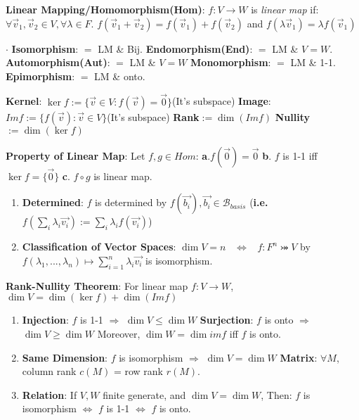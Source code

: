 \documentclass[9pt]{article}
\begin{document}
\textbf{Linear Mapping/Homomorphism(Hom)}: {\small $f:V\to W$ is \textit{linear map} if: $\forall \vec{v}_1,\vec{v}_2\in V,\forall \lambda\in F$. $f(\vec{v}_1+\vec{v}_2)=f(\vec{v}_1)+f(\vec{v}_2)$ and $f(\lambda\vec{v}_1)=\lambda f(\vec{v}_1)$}

$\cdot$ {\scriptsize \textbf{Isomorphism}: $=$ LM \& Bij. \quad \textbf{Endomorphism(End)}: $=$ LM \& $V=W$. \quad \textbf{Automorphism(Aut)}: $=$ LM \& $V=W$ \quad \textbf{Monomorphism}: $=$ LM \& 1-1. \quad \textbf{Epimorphism}: $=$ LM \& onto.}

\textbf{Kernel}: $\ker f:=\{\vec{v}\in V:f(\vec{v})=\vec{0}\}${\tiny (It's subspace)} \quad \textbf{Image}: $Im f:=\{f(\vec{v}):\vec{v}\in V\}${\tiny (It's subspace)} \quad \textbf{Rank}$:=\dim(Im f)$ \quad \textbf{Nullity}$:=\dim(\ker f)$

\textbf{Property of Linear Map}: Let $f,g\in Hom$: \quad \textbf{a}.$f(\vec{0})=\vec{0}$ \quad \textbf{b}. $f$ is 1-1 iff $\ker f=\{\vec{0}\}$ \quad \textbf{c}. $f\circ g$ is linear map. \ \

\begin{enumerate}[itemsep=-2pt, topsep=-2pt]
    \item \textbf{Determined}: $f$ is determined by $f(\vec{b_i}),\vec{b_i}\in \mathcal{B}_{basis}$ {\footnotesize (\star\textbf{i.e.} $f(\sum_{i}\lambda_i\vec{v_i}):=\sum_{i}\lambda_if(\vec{v_i})$)}
    \item \textbf{Classification of Vector Spaces}: $\dim V=n$ \ $\Leftrightarrow$ \ $f:F^n\bij V$ by $f(\lambda_1,...,\lambda_n)\mapsto\sum_{i=1}^{n}\lambda_i\vec{v_i}$ is isomorphism.
\end{enumerate}

\textbf{Rank-Nullity Theorem}: For linear map $f:V\to W$, $\dim V=\dim(\ker f)+\dim(Im f)$ \quad \quad {}

\begin{enumerate}[itemsep=-2pt, topsep=-2pt]
    \item \textbf{Injection}: $f$ is 1-1 $\Rightarrow$ $\dim V \leq \dim W$ \quad \textbf{Surjection}: $f$ is onto $\Rightarrow$ $\dim V \geq \dim W$ \quad Moreover, $\dim W=\dim imf$ iff $f$ is onto.
    \item \textbf{Same Dimension}: {\small $f$ is isomorphism $\Rightarrow$ $\dim V=\dim W$} \quad \quad \quad \textbf{Matrix}: $\forall M$, column rank $c(M)$ = row rank $r(M)$.
    \item \textbf{Relation}: {\small If $V,W$ finite generate, and $\dim V=\dim W$, \quad Then: $f$ is isomorphism $\Leftrightarrow$ $f$ is 1-1 $\Leftrightarrow$ $f$ is onto.}
\end{enumerate}
\end{document}
